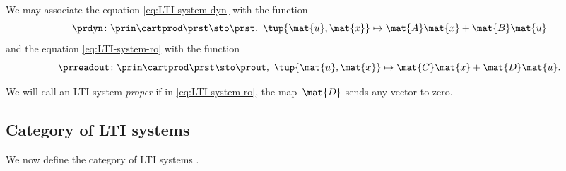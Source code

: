 We may associate the equation \cref{eq:LTI-system-dyn} with the function
\begin{equation}
    \prdyn \colon  \prin \cartprod \prst \sto \prst, \ \tup{\mat{u}, \mat{x}} \mapsto \mat{A}\mat{x} + \mat{B}\mat{u}
\end{equation}
and the equation \cref{eq:LTI-system-ro} with the function
\begin{equation}
    \prreadout \colon \prin \cartprod \prst \sto \prout, \ \tup{\mat{u},\mat{x}} \mapsto \mat{C}\mat{x} + \mat{D}\mat{u}.
\end{equation}

We will call an LTI system \emph{proper} if in \cref{eq:LTI-system-ro}, the map~$\mat{D}$ sends any vector to zero.

\subsection{Category of LTI systems}
We now define the category of LTI systems \LTI.

